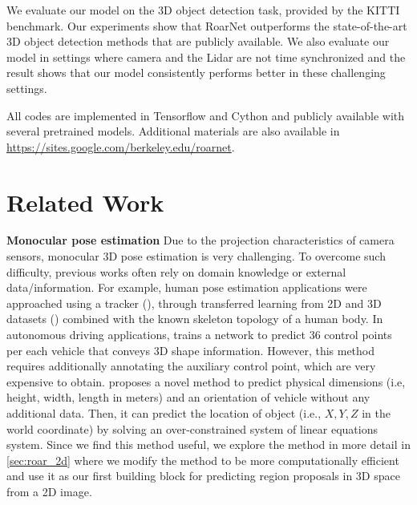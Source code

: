 \documentclass[letterpaper, 10 pt, conference]{ieeeconf}
\newcommand{\subsec}{\quad}
\begin{document}
We evaluate our model on the 3D object detection task, provided by the KITTI benchmark. Our experiments show that RoarNet outperforms the state-of-the-art 3D object detection methods that are publicly available. We also evaluate our model in settings where camera and the Lidar are not time synchronized and the result shows that our model consistently performs better in these challenging settings.

All codes are implemented in Tensorflow and Cython and publicly available with several pretrained models. Additional materials are also available in \url{https://sites.google.com/berkeley.edu/roarnet}.






\section{Related Work}
\textbf{Monocular pose estimation\subsec} Due to the projection characteristics of camera sensors, monocular 3D pose estimation is very challenging. To overcome such difficulty, previous works often rely on domain knowledge or external data/information.
For example, human pose estimation applications were approached using a tracker (\cite{andriluka_monocular_2010}), through transferred learning from 2D and 3D datasets (\cite{mehta2017}) combined with the known skeleton topology of a human body.
In autonomous driving applications, \cite{chabot_deep_2017} trains a network to predict 36 control points per each vehicle that conveys 3D shape information. However, this method requires additionally annotating the auxiliary control point, which are very expensive to obtain. \cite{mousavian_3d_2017} proposes a novel method to predict physical dimensions (i.e, height, width, length in meters) and an orientation of vehicle without any additional data. Then, it can predict the location of object (i.e., $X, Y, Z$ in the world coordinate) by solving an over-constrained system of linear equations system. Since we find this method useful, we explore the method in more detail in \cref{sec:roar_2d} where we modify the method to be more computationally efficient and use it as our first building block for predicting region proposals in 3D space from a 2D image.
\end{document}
